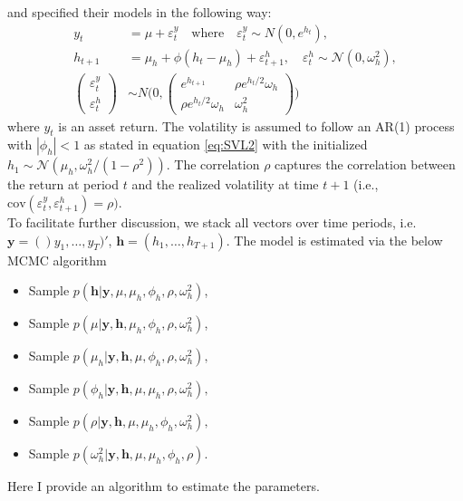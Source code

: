 \documentclass[11pt]{article}
\numberwithin{equation}{section}
\begin{document}
\cite{Yu2005} and \cite{Omori2007} specified their models in the following way:  
\begin{align}
y_t&=\mu+\varepsilon^y_t \quad \text{where}\quad \varepsilon^y_t \sim N(0,  e^{h_t}), \label{eq:SVL1} \\
h_{t+1} &= \mu_h + \phi(h_{t} - \mu_h) + \varepsilon_{t+1}^h, \quad \varepsilon_t^h \sim \mathcal{N}(0, \omega_h^2), \label{eq:SVL2} \\
\begin{pmatrix}
\varepsilon_t^y \\ \varepsilon_t^h 	\end{pmatrix} &\sim N \Bigg( 0, \begin{pmatrix} e^{h_{t+1}} & \rho e^{h_t/2} \omega_h \\ \rho e^{h_t/2} \omega_h & \omega^2_h
\end{pmatrix} \Bigg) \label{eq:SVL3}  
\end{align}
where $y_t$ is an asset return. The volatility is assumed to follow an AR(1) process with $|\phi_h|<1$ as stated in equation \eqref{eq:SVL2} with the initialized $h_1 \sim \mathcal{N}(\mu_h, \omega_h^2/(1 - \rho^2) )$. The correlation $\rho$ captures the correlation between the return at period  $t$ and the realized volatility at time $t+1$ (i.e., $\text{cov}(\varepsilon_t^y, \varepsilon^h_{t+1})=\rho)$. \\

To facilitate further discussion, we stack all vectors over time periods, i.e. $\mathbf{y}=()y_1,\ldots, y_T)'$, $\mathbf{h}=(h_1,\ldots, h_{T+1})$.
The model is estimated via the below MCMC algorithm 
\begin{itemize}
\item Sample $p(\mathbf{h}|\mathbf{y}, \mu, \mu_h, \phi_h, \rho, \omega^2_h)$,
\item Sample $p(\mu|\mathbf{y}, \mathbf{h}, \mu_h, \phi_h, \rho, \omega^2_h)$,
\item Sample $p(\mu_h|\mathbf{y}, \mathbf{h}, \mu, \phi_h, \rho, \omega^2_h),$
\item Sample $p(\phi_h|\mathbf{y}, \mathbf{h}, \mu, \mu_h, \rho, \omega^2_h),$
\item Sample $p(\rho|\mathbf{y}, \mathbf{h}, \mu, \mu_h, \phi_h, \omega^2_h),$
\item Sample $p(\omega^2_h|\mathbf{y}, \mathbf{h}, \mu, \mu_h, \phi_h, \rho).$
\end{itemize}

Here I provide an algorithm to estimate the parameters. 
\end{document}
